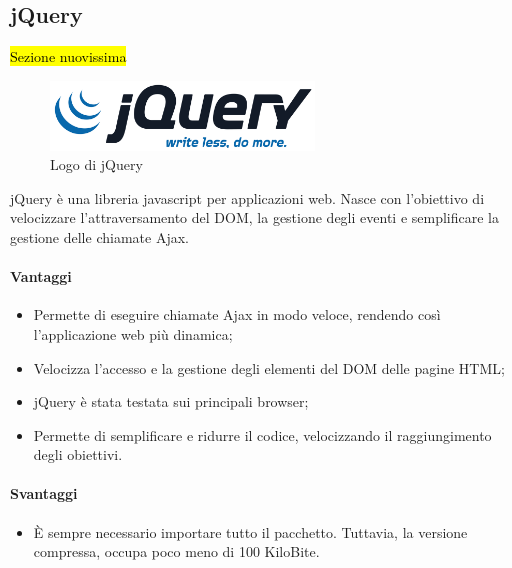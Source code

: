 \subsection{jQuery}
	\hl{Sezione nuovissima}
	\begin{figure}[H]
		\begin{center}
			\includegraphics[width=7cm]{Pics/jquery_logo.png}
			\caption{Logo di jQuery}
			\label{fig:jQueryLogo}
		\end{center}
	\end{figure}
	jQuery è una libreria \gls{javascript} per applicazioni web. Nasce con l'obiettivo di velocizzare l'attraversamento del \gls{DOM}, la gestione degli eventi e semplificare la gestione delle chiamate \gls{Ajax}.
\paragraph{Vantaggi}
	\begin{itemize}
		\item Permette di eseguire chiamate \gls{Ajax} in modo veloce, rendendo così l'applicazione web più dinamica;
		\item Velocizza l'accesso e la gestione degli elementi del DOM delle pagine HTML;
		\item jQuery è stata testata sui principali \gls{browser};
		\item Permette di semplificare e ridurre il codice, velocizzando il raggiungimento degli obiettivi. 
	\end{itemize}
\paragraph{Svantaggi}
	\begin{itemize}
		\item È sempre necessario importare tutto il pacchetto. Tuttavia, la versione compressa, occupa poco meno di 100 KiloBite. 
\end{itemize}